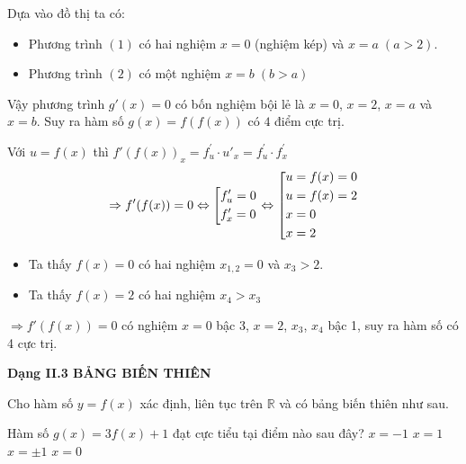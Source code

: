 \begin{ex}
{\begin{description}
\begin{center}
\end{center}
Dựa vào đồ thị ta có:
\begin{itemize}
\item Phương trình $(1)$ có hai nghiệm $x=0$ (nghiệm kép) và $x=a \; (a>2)$.
\item  Phương trình $(2)$ có một nghiệm $x=b \; (b>a)$
\end{itemize}
Vậy phương trình $g'(x)=0$ có bốn nghiệm bội lẻ là $x=0$, $x=2$, $x=a$ và $x=b$. Suy ra hàm số $g(x)=f(f(x))$ có $4$ điểm cực trị.
\item[Cách 2] 
Với $u=f(x)$ thì $f'(f(x))_x = f^{'}_u \cdot u'_x = f^{'}_u \cdot f^{'}_x$ 
$$\Rightarrow f'(f(x)) =0 \Leftrightarrow \left[\begin{aligned}&f'_u=0\\&f'_x = 0\end{aligned}\right. \Leftrightarrow \left[\begin{aligned}&u=f(x)=0\\&u=f(x)=2\\&x=0\\&x=2\end{aligned}\right.$$
\begin{itemize}
\item Ta thấy $f(x)=0$ có hai nghiệm $x_{1,2}=0$ và $x_3>2$.
\item Ta thấy $f(x)=2$ có hai nghiệm $x_4>x_3$
\end{itemize}
$\Rightarrow f'(f(x))=0$ có nghiệm $x=0$ bậc 3, $x=2$, $x_3$, $x_4$ bậc 1, suy ra hàm số có 4 cực trị.
\end{description}
	}
\end{ex}

\textbf{Dạng II.3 BẢNG BIẾN THIÊN}

\begin{ex}%
Cho hàm số $y=f(x)$ xác định, liên tục trên $\mathbb{R}$ và có bảng biến thiên như sau.
\begin{center}
\end{center}
Hàm số $g(x)=3f(x)+1$ đạt cực tiểu tại điểm nào sau đây?
	\choice
	{$x=-1$}
	{$x=1$}
	{\True $x=\pm 1$}
	{$x=0$}
\end{ex}

